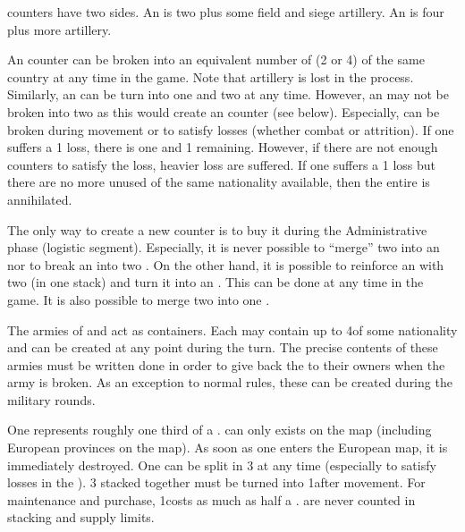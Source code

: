 \aparag[Armies.] \ARMY counters have two sides. An \ARMY\facemoins is two \LD
plus some field and siege artillery. An \ARMY\faceplus is four \LD plus more
artillery.

 An \ARMY counter can be broken into an equivalent
number of \LD (2 or 4) of the same country at any time in the game. Note that
artillery is lost in the process.
\bparag Similarly, an \ARMY\faceplus can be turn into one \ARMY\facemoins and
two \LD at any time.
\bparag However, an \ARMY\faceplus may not be broken into two
\ARMY\facemoins as this would create an \ARMY counter (see below).
\bparag Especially, \ARMY can be broken during movement or to satisfy losses
(whether combat or attrition). If one \ARMY\faceplus suffers a 1 \LD loss,
there is one \ARMY\facemoins and 1 \LD remaining.
\bparag However, if there are not enough \LD counters to satisfy the loss,
heavier loss are suffered. If one \ARMY\facemoins suffers a 1 \LD loss but
there are no more unused \LD of the same nationality available, then the
entire \ARMY\facemoins is annihilated.

 The only way to create a new \ARMY
counter is to buy it during the Administrative phase (logistic segment).
\bparag Especially, it is never possible to ``merge'' two \LD into an
\ARMY\facemoins nor to break an \ARMY\faceplus into two \ARMY\facemoins.
\bparag On the other hand, it is possible to reinforce an \ARMY\facemoins with
two \LD (in one stack) and turn it into an \ARMY\faceplus. This can be done at
any time in the game.
\bparag It is also possible to merge two \ARMY\facemoins into one
\ARMY\faceplus.

 The armies of  and 
act as containers. Each may contain up to 4\LD of some nationality and can be
created at any point during the turn. The precise contents of these armies
must be written done in order to give back the \LD to their owners when the
army is broken.
\bparag As an exception to normal rules, these \ARMY can be created during the
military rounds.

 One \LDE represents roughly one third of
a \LD.
\bparag \LDE can only exists on the \ROTW map (including European provinces on
the \ROTW map). As soon as one \LDE enters the European map, it is immediately
destroyed.
\bparag One \LD can be split in 3 \LDE at any time (especially to satisfy
losses in the \ROTW). 3 \LDE stacked together must be turned into 1\LD after
movement.
\bparag For maintenance and purchase, 1\LDE costs as much as half a \LD.
\bparag \LDE are never counted in stacking and supply limits.

